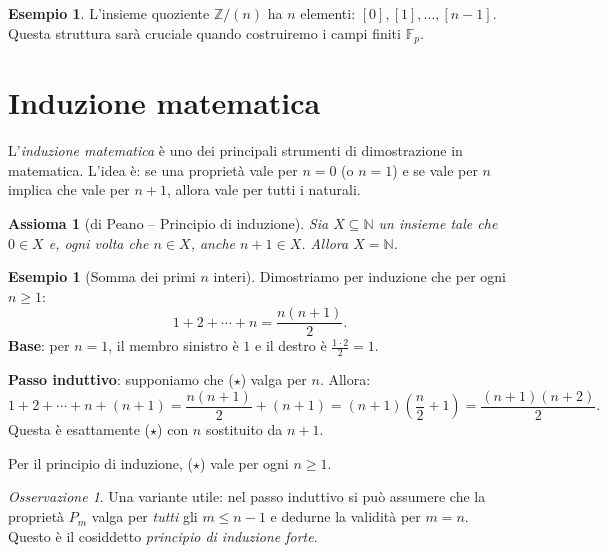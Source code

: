 \documentclass[11pt, a4paper]{book}
\theoremstyle{definition}
\newtheorem{esempio}[definizione]{Esempio}
\theoremstyle{plain}
\newtheorem{assioma}[definizione]{Assioma}
\theoremstyle{remark}
\newtheorem{osservazione}[definizione]{Osservazione}
\newcommand{\N}{\mathbb{N}}
\newcommand{\Z}{\mathbb{Z}}
\begin{document}
\begin{exbox}
\begin{esempio}
L'insieme quoziente $\Z/(n)$ ha $n$ elementi: $[0], [1], \ldots, [n-1]$. Questa struttura sarà cruciale quando costruiremo i campi finiti $\mathbb{F}_p$.
\end{esempio}
\end{exbox}

\section{Induzione matematica}

L'\emph{induzione matematica} è uno dei principali strumenti di dimostrazione in matematica. L'idea è: se una proprietà vale per $n = 0$ (o $n = 1$) e se vale per $n$ implica che vale per $n+1$, allora vale per tutti i naturali.

\begin{defbox}
\begin{assioma}[di Peano -- Principio di induzione]
Sia $X \subseteq \N$ un insieme tale che $0 \in X$ e, ogni volta che $n \in X$, anche $n+1 \in X$. Allora $X = \N$.
\end{assioma}
\end{defbox}

\begin{exbox}
\begin{esempio}[Somma dei primi $n$ interi]
Dimostriamo per induzione che per ogni $n \geq 1$:
\[
  1 + 2 + \cdots + n = \frac{n(n+1)}{2}. \tag{$\star$}
\]
\textbf{Base}: per $n = 1$, il membro sinistro è $1$ e il destro è $\frac{1 \cdot 2}{2} = 1$. \checkmark

\textbf{Passo induttivo}: supponiamo che ($\star$) valga per $n$. Allora:
\[
  1 + 2 + \cdots + n + (n+1) = \frac{n(n+1)}{2} + (n+1) = (n+1)\!\left(\frac{n}{2} + 1\right) = \frac{(n+1)(n+2)}{2}.
\]
Questa è esattamente ($\star$) con $n$ sostituito da $n+1$. \checkmark

Per il principio di induzione, ($\star$) vale per ogni $n \geq 1$.
\end{esempio}
\end{exbox}

\begin{osservazione}
Una variante utile: nel passo induttivo si può assumere che la proprietà $P_m$ valga per \emph{tutti} gli $m \leq n-1$ e dedurne la validità per $m = n$. Questo è il cosiddetto \emph{principio di induzione forte}.
\end{osservazione}
\end{document}
